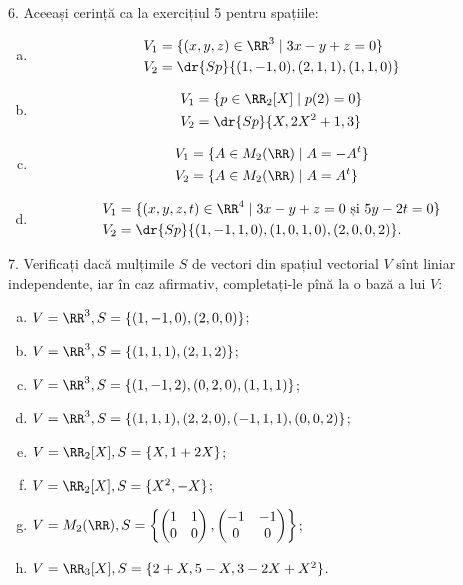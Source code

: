 6. Aceeași cerință ca la exercițiul 5 pentru spațiile:
\begin{enumerate}[(a)]
\item %
  \begin{align*}
    V_1 &= \{ (x, y, z) \in \RR^3 \mid 3x - y + z = 0 \} \\
    V_2 &= \dr{Sp}\{(1, -1, 0), (2, 1, 1), (1, 1, 0) \}
  \end{align*}
\item %
  \begin{align*}
    V_1 &= \{ p \in \RR_2[X] \mid p(2) = 0 \} \\
    V_2 &= \dr{Sp}\{ X, 2X^2 + 1, 3 \}
  \end{align*}
\item %
  \begin{align*}
    V_1 &= \{ A \in M_2(\RR) \mid A = -A^t \} \\
    V_2 &= \{ A \in M_2(\RR) \mid A = A^t \}
  \end{align*}
\item %
  \begin{align*}
    V_1 &= \{ (x, y, z, t) \in \RR^4 \mid 3x - y + z = 0 \text{ și } %
          5y - 2t = 0 \} \\
    V_2 &= \dr{Sp}\{ (1, -1, 1, 0), (1, 0, 1, 0), (2, 0, 0, 2) \}.
  \end{align*}
\end{enumerate}

\vspace{1cm}

7. Verificați dacă mulțimile $ S $ de vectori din spațiul vectorial $ V $
sînt liniar independente, iar în caz afirmativ, completați-le pînă la o bază
a lui $ V $:
\begin{enumerate}[(a)]
\item $ V = \RR^3, S = \{(1, -1, 0), (2, 0, 0) \} $;
\item $ V = \RR^3, S = \{(1, 1, 1), (2, 1, 2) \} $;
\item $ V = \RR^3, S = \{(1, -1, 2), (0, 2, 0), (1, 1, 1) \} $;
\item $ V = \RR^3, S = \{(1, 1, 1), (2, 2, 0), (-1, 1, 1), (0, 0, 2) \} $;
\item $ V = \RR_2[X], S = \{ X, 1 + 2X \} $;
\item $ V = \RR_2[X], S = \{ X^2, -X \} $;
\item $ V = M_2(\RR), S = \left\{ \begin{pmatrix} 1 & 1 \\ 0 & 0 \end{pmatrix}, %
    \begin{pmatrix} -1 & -1 \\ 0 & 0 \end{pmatrix} \right\} $;
\item $ V = \RR_3[X], S = \{ 2 + X, 5 - X, 3 - 2X + X^2 \} $.
\end{enumerate}

